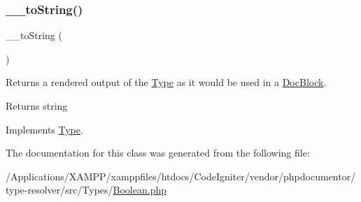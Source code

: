 \subsubsection{\texorpdfstring{\+\_\+\+\_\+to\+String()}{\_\_toString()}}
{\footnotesize\ttfamily \+\_\+\+\_\+to\+String (\begin{DoxyParamCaption}{ }\end{DoxyParamCaption})}

Returns a rendered output of the \mbox{\hyperlink{interfacephp_documentor_1_1_reflection_1_1_type}{Type}} as it would be used in a \mbox{\hyperlink{classphp_documentor_1_1_reflection_1_1_doc_block}{Doc\+Block}}.

\begin{DoxyReturn}{Returns}
string 
\end{DoxyReturn}


Implements \mbox{\hyperlink{interfacephp_documentor_1_1_reflection_1_1_type_a7516ca30af0db3cdbf9a7739b48ce91d}{Type}}.



The documentation for this class was generated from the following file\+:\begin{DoxyCompactItemize}
\item 
/\+Applications/\+X\+A\+M\+P\+P/xamppfiles/htdocs/\+Code\+Igniter/vendor/phpdocumentor/type-\/resolver/src/\+Types/\mbox{\hyperlink{_boolean_8php}{Boolean.\+php}}\end{DoxyCompactItemize}
